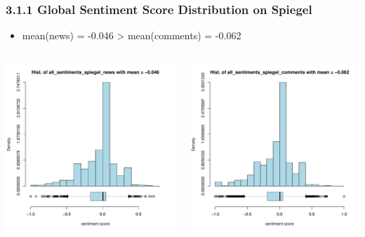 \documentclass{tum-presentation}
\begin{document}
\begin{frame}
  \frametitle{3.1.1 Global Sentiment Score Distribution on Spiegel}
  \begin{itemize}
    \item mean(news) = -0.046 > mean(comments) = -0.062
 \end{itemize}
  \begin{columns}
    \begin{minipage}[c]{\linewidth}
        \centering
        \includegraphics[width=0.8\linewidth]{figures/overview_all_sentiments_spiegel_news.pdf}
    \end{minipage}
    \begin{minipage}[c]{\linewidth}
        \centering
        \includegraphics[width=0.8\linewidth]{figures/overview_all_sentiments_spiegel_comments.pdf}
    \end{minipage}
    
\end{columns}
\end{frame}
\end{document}
